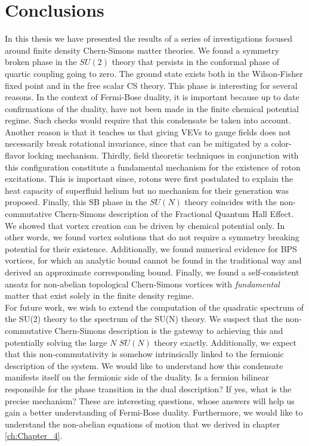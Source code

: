 
\chapter*{Conclusions}

    In this thesis we have presented the results of a series of investigations focused around finite density Chern-Simons matter theories. We found a symmetry broken phase in the $SU(2)$ theory that persists in the conformal phase of quartic coupling going to zero. The ground state exists both in the Wilson-Fisher fixed point and in the free scalar CS theory. This phase is interesting for several reasons. In the context of Fermi-Bose duality, it is important because up to date confirmations of the duality, have not been made in the finite chemical potential regime. Such checks would require that this condensate be taken into account. Another reason is that it teaches us that giving VEVs to gauge fields does not necessarily break rotational invariance, since that can be mitigated by a color-flavor locking mechanism. Thirdly, field theoretic techniques in conjunction with this configuration constitute a fundamental mechanism for the existence of roton excitations. This is important since, rotons were first postulated to explain the heat capacity of superfluid helium but no mechanism for their generation was proposed. Finally, this SB phase in the $SU(N)$ theory coincides with the non-commutative Chern-Simons description of the Fractional Quantum Hall Effect.\\
    \indent We showed that vortex creation can be driven by chemical potential only. In other words, we found vortex solutions that do not require a symmetry breaking potential for their existence. Additionally, we found numerical evidence for BPS vortices, for which an analytic bound cannot be found in the traditional way and derived an approximate corresponding bound. Finally, we found a self-consistent ansatz for non-abelian topological Chern-Simons vortices with \textit{fundamental} matter that exist solely in the finite density regime.\\
    \indent For future work, we wish to extend the computation of the quadratic spectrum of the SU(2) theory to the spectrum of the SU(N) theory. We suspect that the non-commutative Chern-Simons description is the gateway to achieving this and potentially solving the large $N$ $SU(N)$ theory exactly. Additionally, we expect that this non-commutativity is somehow intrinsically linked to the fermionic description of the system. We would like to understand how this condensate manifests itself on the fermionic side of the duality. Is a fermion bilinear responsible for the phase transition in the dual description? If yes, what is the precise mechanism? These are interesting questions, whose answers will help us gain a better understanding of Fermi-Bose duality. Furthermore, we would like to understand the non-abelian equations of motion that we derived in chapter \ref{ch:Chapter_4}.\\

